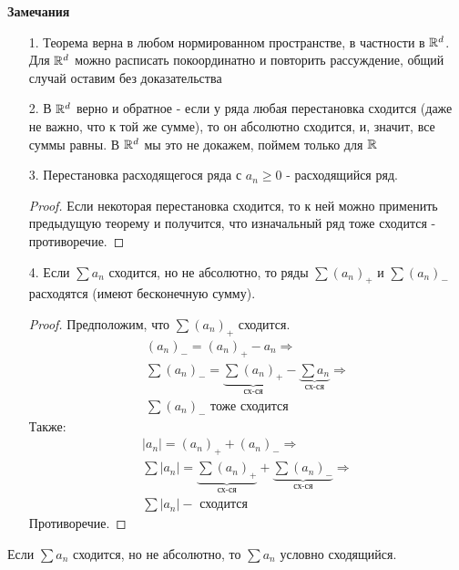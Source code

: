 \textbf{Замечания}
\begin{enumerate}
    \item[1.] Теорема верна в любом нормированном пространстве, в частности в $\mathbb{R}^d$.
    Для $\mathbb{R}^d$ можно расписать покоординатно и повторить рассуждение, общий случай оставим без доказательства
    \item[2.] В $\mathbb{R}^d$ верно и обратное - если у ряда любая перестановка сходится (даже не важно, что к той же сумме), то он абсолютно сходится,
    и, значит, все суммы равны. В $\mathbb{R}^d$ мы это не докажем, поймем только для $\mathbb{R}$
    \item[3.] Перестановка расходящегося ряда с $a_n \geq 0$ - расходящийся ряд.
    \begin{proof}
        Если некоторая перестановка сходится, то к ней можно применить предыдущую теорему и получится, что изначальный ряд тоже сходится - противоречие.
    \end{proof} 
    \item[4.] Если $\sum a_n$ сходится, но не абсолютно, то ряды $\sum (a_n)_+$ и $\sum (a_n)_-$ расходятся (имеют бесконечную сумму).  
    \begin{proof}
        Предположим, что $\sum(a_n)_+$ сходится. 
        \begin{gather*}
            (a_n)_- = (a_n)_+ - a_n \Longrightarrow \\
            \sum (a_n)_- = \underbrace{\sum (a_n)_+}_{\text{сх-ся}} - \underbrace{\sum a_n}_{\text{сх-ся}} \Longrightarrow \\
            \sum(a_n)_- \text{ тоже сходится}
        \end{gather*}
        Также:
        \begin{gather*}
            |a_n| = (a_n)_+ + (a_n)_- \Longrightarrow \\ 
            \sum |a_n| = \underbrace{\sum (a_n)_+}_{\text{сх-ся}} + \underbrace{\sum (a_n)_-}_{\text{сх-ся}} \Longrightarrow \\
            \sum |a_n| - \text{ сходится}
        \end{gather*}
        Противоречие.
    \end{proof}
\end{enumerate}

\begin{conj}
    Если $\sum a_n$ сходится, но не абсолютно, то $\sum a_n$ условно сходящийся.
\end{conj}